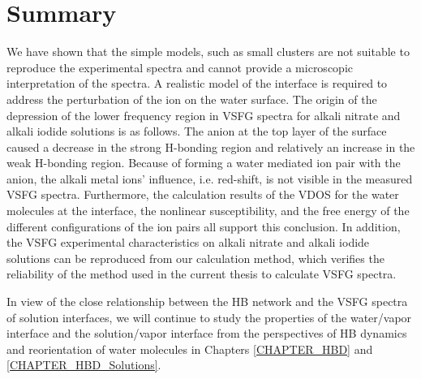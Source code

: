 \section{Summary}
We have shown that the simple models,
such as small clusters are not suitable to reproduce the experimental spectra and cannot provide a microscopic interpretation of the spectra. 
A realistic model of the interface is required to address the perturbation of the ion on the water surface.
The origin of the depression of the lower frequency region in VSFG spectra 
for alkali nitrate  and alkali iodide solutions 
is as follows. 
The anion at the top layer of the surface caused a decrease 
in the strong H-bonding region and relatively an increase in the weak H-bonding region. 
Because of forming a water mediated ion pair with the anion, 
the alkali metal ions' influence, i.e. red-shift, is not visible in the measured VSFG spectra.
Furthermore, the calculation results of the VDOS for the water molecules at the interface, the nonlinear susceptibility, 
and the free energy of the different configurations of the ion pairs all support this conclusion.
In addition, the VSFG experimental characteristics on alkali nitrate and alkali iodide solutions can be reproduced 
from our calculation method, which verifies the reliability of the method used in the current thesis to calculate VSFG spectra.

In view of the close relationship between the HB network and the VSFG spectra of solution interfaces, 
we will continue to study the properties of the water/vapor interface and the solution/vapor interface from the perspectives of HB dynamics and reorientation of water molecules 
in Chapters \ref{CHAPTER_HBD} and \ref{CHAPTER_HBD_Solutions}.

